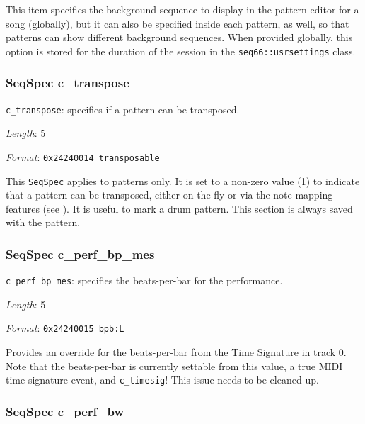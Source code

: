    This item specifies the background sequence to display in the pattern
   editor for a song (globally), but it
   can also be specified inside each pattern, as well, so that patterns
   can show different background sequences.
   When provided globally, this option is stored for the duration
   of the session in the
   \texttt{seq66::usrsettings} class.

\subsubsection{SeqSpec c\_transpose}
\label{subsubsec:midi_format_track_seqspec_transpose}

   \begin{description}
      \item \texttt{c\_transpose}: specifies if a pattern can be transposed.
      \item \textsl{Length}: 5
      \item \textsl{Format}: \texttt{0x24240014 transposable}
   \end{description}

   This
   \texttt{SeqSpec} applies to patterns only.
   It is set to a non-zero value (1) to indicate
   that a pattern can be transposed, either on the fly or via the
   note-mapping features (see ).
   It is useful to mark a drum pattern.
   This section is always saved with the pattern.

\subsubsection{SeqSpec c\_perf\_bp\_mes}
\label{subsubsec:midi_format_track_seqspec_perf_bp_mes}

    \begin{description}
       \item \texttt{c\_perf\_bp\_mes}:
         specifies the beats-per-bar for the performance.
       \item \textsl{Length}: 5
       \item \textsl{Format}: \texttt{0x24240015 bpb:L}
    \end{description}

   Provides an override for the beats-per-bar from the Time Signature in track
   0.
   Note that the beats-per-bar is currently settable from this value,
   a true MIDI time-signature event, and \texttt{c\_timesig}!
   This issue needs to be cleaned up.

\subsubsection{SeqSpec c\_perf\_bw}
\label{subsubsec:midi_format_track_seqspec_perf_bw}

